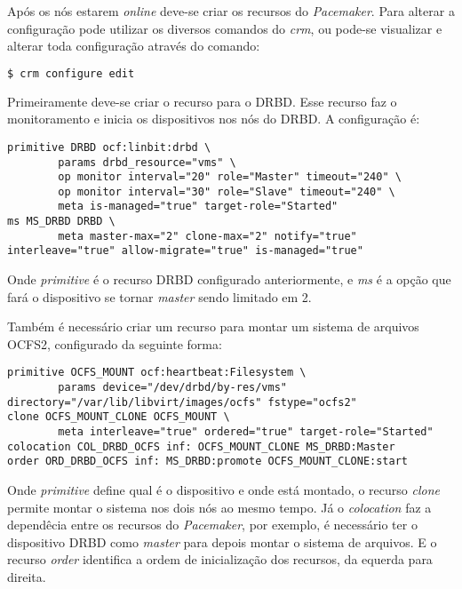Após os nós estarem \textit{online} deve-se criar os recursos do \textit{Pacemaker}. Para alterar a configuração pode utilizar os diversos
comandos do \textit{crm}, ou pode-se visualizar e alterar toda configuração através do comando:
\begin{lstlisting}[language=bash]
 $ crm configure edit
\end{lstlisting}

Primeiramente deve-se criar o recurso para o \ac{DRBD}. Esse recurso faz o monitoramento e inicia os dispositivos nos nós do \ac{DRBD}.
A configuração é:
\begin{lstlisting}
primitive DRBD ocf:linbit:drbd \
        params drbd_resource="vms" \
        op monitor interval="20" role="Master" timeout="240" \
        op monitor interval="30" role="Slave" timeout="240" \
        meta is-managed="true" target-role="Started"
ms MS_DRBD DRBD \
        meta master-max="2" clone-max="2" notify="true" interleave="true" allow-migrate="true" is-managed="true" 
\end{lstlisting}
Onde \textit{primitive} é o recurso \ac{DRBD} configurado anteriormente, e \textit{ms} é a opção que fará o dispositivo se tornar \textit{master}
sendo limitado em 2.

Também é necessário criar um recurso para montar um sistema de arquivos \ac{OCFS2}, configurado da seguinte forma:
\begin{lstlisting}
primitive OCFS_MOUNT ocf:heartbeat:Filesystem \
        params device="/dev/drbd/by-res/vms" directory="/var/lib/libvirt/images/ocfs" fstype="ocfs2"
clone OCFS_MOUNT_CLONE OCFS_MOUNT \
        meta interleave="true" ordered="true" target-role="Started"
colocation COL_DRBD_OCFS inf: OCFS_MOUNT_CLONE MS_DRBD:Master
order ORD_DRBD_OCFS inf: MS_DRBD:promote OCFS_MOUNT_CLONE:start
\end{lstlisting}
Onde \textit{primitive} define qual é o dispositivo e onde está montado, o recurso \textit{clone} permite montar o sistema nos dois nós
ao mesmo tempo. Já o \textit{colocation} faz a dependêcia entre os recursos do \textit{Pacemaker}, por exemplo, é necessário ter o dispositivo 
\ac{DRBD} como \textit{master} para depois montar o sistema de arquivos. E o recurso \textit{order} identifica a ordem de inicialização dos 
recursos, da equerda para direita.

